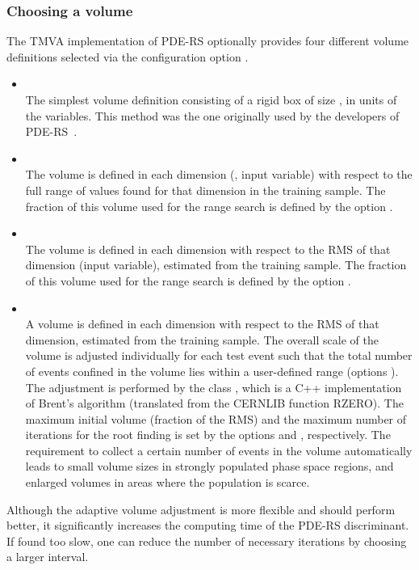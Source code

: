 \subsubsection*{Choosing a volume}

The TMVA implementation of PDE-RS optionally provides four different 
volume definitions selected via the configuration option .
\begin{itemize}

\item	{} \\
		The simplest volume definition consisting of a rigid box of size ,
      in units of the variables.
		This method was the one originally used by the developers of 	
		PDE-RS~\cite{CarliKoblitz}.

\item {} \\ 
		The volume is defined in each dimension (\ie, input variable) 
      with respect to the full range of values found for that dimension
		in the training sample. The fraction of this volume used 
		for the range search is defined by the option .

\item {} \\
		The volume is defined in each dimension with respect 
		to the RMS of that dimension (input variable), estimated from the 
		training sample. The fraction of this volume used 
		for the range search is defined by the option .

\item	{} \\ 
		A volume is defined in each dimension
		with respect to the RMS of that dimension, estimated from the 
		training sample. The overall scale of the volume is  
		adjusted individually for each test event such 
		that the total number of events confined in the volume lies within 
		a user-defined range (options ). The adjustment
		is performed by the class , which is a C++ implementation
		of Brent's algorithm (translated from the CERNLIB function RZERO).
		The maximum initial volume (fraction of the RMS) and the maximum
		number of iterations for the root finding is set by the options 
		 and , respectively. The
		requirement to collect a certain number of events in the volume 
		automatically leads to small volume sizes in strongly populated 
		phase space regions, and enlarged volumes in areas where the
		population is scarce.			

\end{itemize}
Although the adaptive volume adjustment is more flexible and should perform
better, it significantly increases the computing time of the PDE-RS discriminant.
If found too slow, one can reduce the number of necessary iterations by 
choosing a larger  interval.

